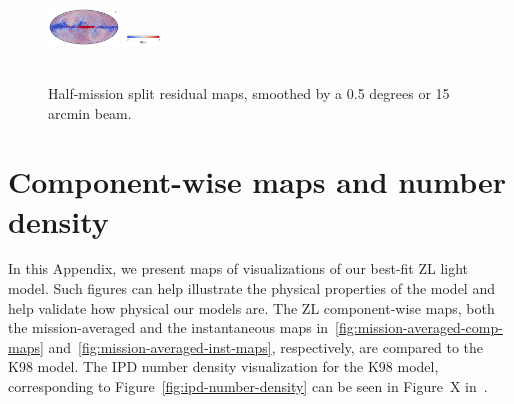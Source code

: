 \documentclass[twocolumn]{aa}
\begin{document}
\begin{figure}[hbt]
{    \includegraphics[height=1cm]{figs/compare_zodi_res/cosmoglobe_res_09b.pdf}%
    \includegraphics[width=1cm,angle=90]{figs/compare_zodi_res/cbar_09.pdf}%
    }\\
    \\
    \caption{Half-mission split residual maps, smoothed by a 0.5 degrees or 15 arcmin beam.}
    \label{fig:half-mission-res2}
\end{figure}

\clearpage
\section{Component-wise maps and number density}
\label{sec:zodi-comps}

In this Appendix, we present maps of visualizations of our best-fit ZL 
light model. Such figures can help illustrate the physical properties 
of the model and help validate how physical our models are. The ZL 
component-wise maps, both the mission-averaged and the instantaneous maps 
in~\ref{fig:mission-averaged-comp-maps} 
and~\ref{fig:mission-averaged-inst-maps}, respectively, are compared to 
the K98 model. The IPD number density visualization for the K98 model, 
corresponding to Figure~\ref{fig:ipd-number-density} can be seen in 
Figure~X in~\cite{San2022}.


\end{document}
